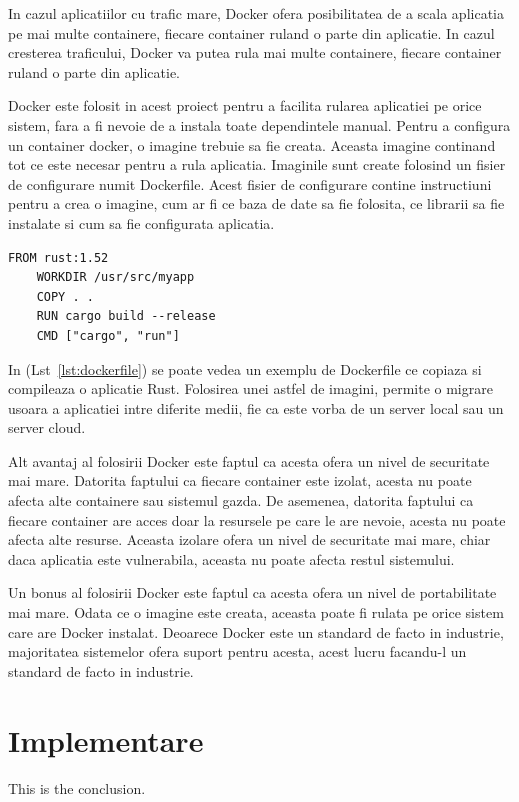 \documentclass[titlepage,12pt]{article}
\begin{document}
In cazul aplicatiilor cu trafic mare, Docker ofera posibilitatea de a scala aplicatia pe mai multe containere, fiecare container ruland o parte din aplicatie.
In cazul cresterea traficului, Docker va putea rula mai multe containere, fiecare container ruland o parte din aplicatie.

Docker este folosit in acest proiect pentru a facilita rularea aplicatiei pe orice sistem, fara a fi nevoie de a instala toate dependintele manual.
Pentru a configura un container docker, o imagine trebuie sa fie creata.
Aceasta imagine continand tot ce este necesar pentru a rula aplicatia.
Imaginile sunt create folosind un fisier de configurare numit Dockerfile.
Acest fisier de configurare contine instructiuni pentru a crea o imagine, cum ar fi ce baza de date sa fie folosita, ce librarii sa fie instalate si cum sa fie configurata aplicatia.
\begin{lstlisting}[language=docker,caption={Exemplu Dockerfile},label={lst:dockerfile}]
    FROM rust:1.52
    WORKDIR /usr/src/myapp
    COPY . .
    RUN cargo build --release
    CMD ["cargo", "run"]
\end{lstlisting}
In (Lst~\ref{lst:dockerfile}) se poate vedea un exemplu de Dockerfile ce copiaza si compileaza o aplicatie Rust.
Folosirea unei astfel de imagini, permite o migrare usoara a aplicatiei intre diferite medii, fie ca este vorba de un server local sau un server cloud.

Alt avantaj al folosirii Docker este faptul ca acesta ofera un nivel de securitate mai mare.
Datorita faptului ca fiecare container este izolat, acesta nu poate afecta alte containere sau sistemul gazda.
De asemenea, datorita faptului ca fiecare container are acces doar la resursele pe care le are nevoie, acesta nu poate afecta alte resurse.
Aceasta izolare ofera un nivel de securitate mai mare, chiar daca aplicatia este vulnerabila, aceasta nu poate afecta restul sistemului.

Un bonus al folosirii Docker este faptul ca acesta ofera un nivel de portabilitate mai mare. Odata ce o imagine este creata, aceasta poate fi rulata pe orice sistem care are Docker instalat.
Deoarece Docker este un standard de facto in industrie, majoritatea sistemelor ofera suport pentru acesta, acest lucru facandu-l un standard de facto in industrie.

\section{Implementare}
This is the conclusion.
\end{document}
